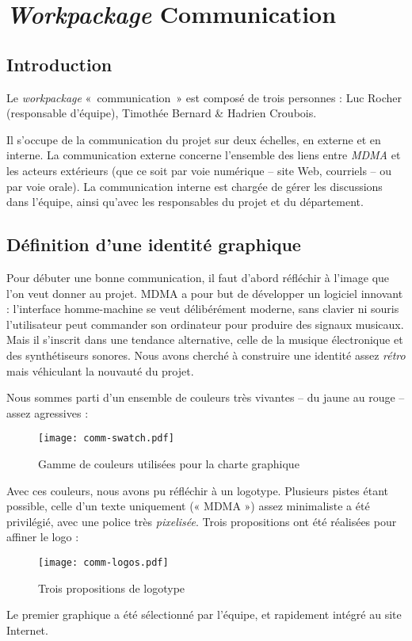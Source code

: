 \section{\emph{Workpackage} Communication}
\subsection{Introduction}
\par Le \emph{workpackage} «~communication~» est composé de trois personnes : Luc Rocher (responsable d'équipe), Timothée Bernard \& Hadrien Croubois.
\par Il s'occupe de la communication du projet sur deux échelles, en externe et en interne. La communication externe concerne l'ensemble des liens entre \emph{MDMA} et les acteurs extérieurs (que ce soit par voie numérique -- site Web, courriels -- ou par voie orale). La communication interne est chargée de gérer les discussions dans l'équipe, ainsi qu'avec les responsables du projet et du département.
\subsection{Définition d'une identité graphique}
\par Pour débuter une bonne communication, il faut d'abord réfléchir à l'image que l'on veut donner au projet. MDMA a pour but de développer un logiciel innovant : l'interface homme-machine se veut délibérément moderne, sans clavier ni souris l'utilisateur peut commander son ordinateur pour produire des signaux musicaux. Mais il s'inscrit dans une tendance alternative, celle de la musique électronique et des synthétiseurs sonores. Nous avons cherché à construire une identité assez \emph{rétro} mais véhiculant la nouvauté du projet.
\par Nous sommes parti d'un ensemble de couleurs très vivantes -- du jaune au rouge -- assez agressives :
\begin{figure}[H]
  \centering
  \texttt{[image: comm-swatch.pdf]}
  \caption{Gamme de couleurs utilisées pour la charte graphique}
  \label{fig:swatch}
\end{figure}
\par Avec ces couleurs, nous avons pu réfléchir à un logotype. Plusieurs pistes étant possible, celle d'un texte uniquement (« MDMA ») assez minimaliste a été privilégié, avec une police très \emph{pixelisée}. Trois propositions ont été réalisées pour affiner le logo :
\begin{figure}[H]
  \centering
    \texttt{[image: comm-logos.pdf]}
  \caption{Trois propositions de logotype}
  \label{fig:Logos-MDMA}
\end{figure}
\par Le premier graphique a été sélectionné par l'équipe, et rapidement intégré au site Internet.
